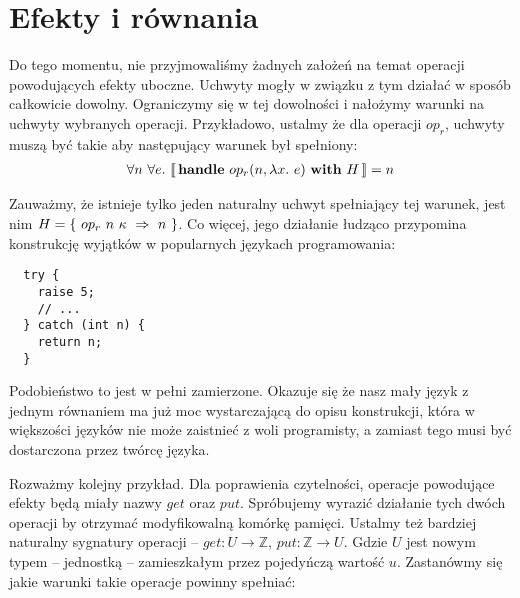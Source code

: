 \documentclass[shortabstract]{iithesis}
\begin{document}
\section{Efekty i równania}

Do tego momentu, nie przyjmowaliśmy żadnych założeń na temat operacji powodujących efekty uboczne. Uchwyty mogły w związku z tym działać w sposób całkowicie dowolny. Ograniczymy się w tej dowolności i nałożymy warunki na uchwyty wybranych operacji. Przykładowo, ustalmy że dla operacji \(op_r\), uchwyty muszą być takie aby następujący warunek był spełniony:
\begin{align*}
  \forall n\ \forall e.\ \llbracket\, \mathbf{handle}\ op_r(n, \lambda x.\ e)\ \mathbf{with}\ H\, \rrbracket = n
\end{align*}

\pagebreak

Zauważmy, że istnieje tylko jeden naturalny uchwyt spełniający tej warunek, jest nim \(H = \{\ \hcase{op_r}{n\ \kappa}{n} \ \}\). Co więcej, jego działanie łudząco przypomina konstrukcję wyjątków w popularnych językach programowania:

\begin{lstlisting}
  try {
    raise 5;
    // ...
  } catch (int n) {
    return n;
  }
\end{lstlisting}

Podobieństwo to jest w pełni zamierzone. Okazuje się że nasz mały język z jednym równaniem ma już moc wystarczającą do opisu konstrukcji, która w większości języków nie może zaistnieć z woli programisty, a zamiast tego musi być dostarczona przez twórcę języka.

Rozważmy kolejny przykład. Dla poprawienia czytelności, operacje powodujące efekty będą miały nazwy \(get\) oraz \(put\). Spróbujemy wyrazić działanie tych dwóch operacji by otrzymać modyfikowalną komórkę pamięci. Ustalmy też bardziej naturalny sygnatury operacji -- \(get: U \rightarrow \mathbb{Z}\), \(put: \mathbb{Z} \rightarrow U\). Gdzie \(U\) jest nowym typem -- jednostką -- zamieszkałym przez pojedyńczą wartość \(u\). Zastanówmy się jakie warunki takie operacje powinny spełniać:
\end{document}
